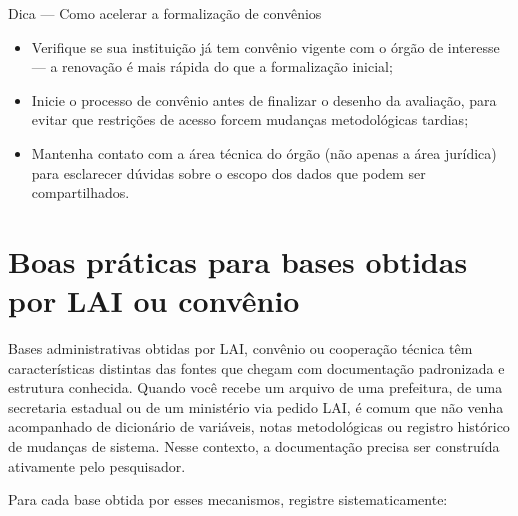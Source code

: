 \begin{boxdica}{Dica --- Como acelerar a formalização de convênios}
\begin{itemize}
  \item Verifique se sua instituição já tem convênio vigente com o órgão de interesse --- a renovação é mais rápida do que a formalização inicial;
  \item Inicie o processo de convênio antes de finalizar o desenho da avaliação, para evitar que restrições de acesso forcem mudanças metodológicas tardias;
  \item Mantenha contato com a área técnica do órgão (não apenas a área jurídica) para esclarecer dúvidas sobre o escopo dos dados que podem ser compartilhados.
\end{itemize}
\end{boxdica}

\section{Boas práticas para bases obtidas por LAI ou convênio}

Bases administrativas obtidas por LAI, convênio ou cooperação técnica têm características distintas das fontes que chegam com documentação padronizada e estrutura conhecida. Quando você recebe um arquivo de uma prefeitura, de uma secretaria estadual ou de um ministério via pedido LAI, é comum que não venha acompanhado de dicionário de variáveis, notas metodológicas ou registro histórico de mudanças de sistema. Nesse contexto, a documentação precisa ser construída ativamente pelo pesquisador.

Para cada base obtida por esses mecanismos, registre sistematicamente:

